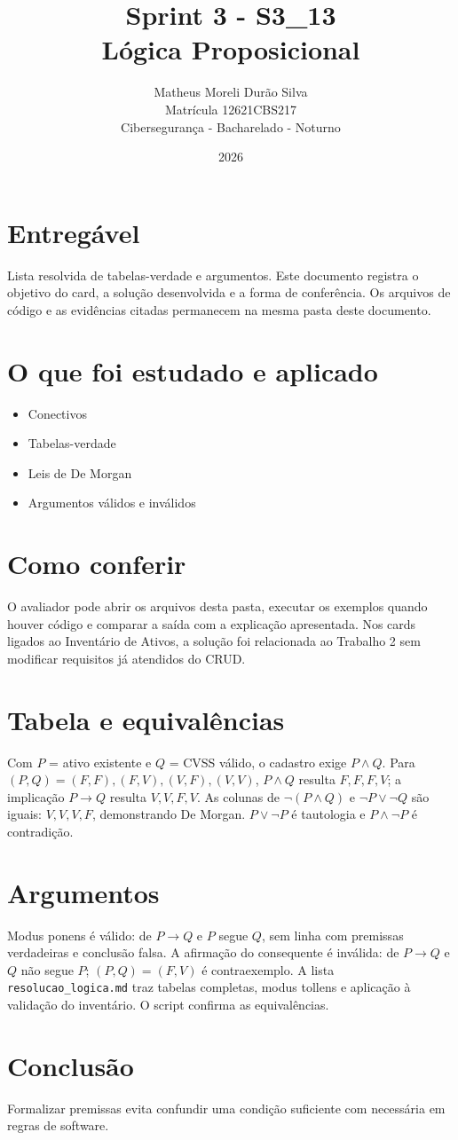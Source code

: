\documentclass[12pt]{article}
\title{Sprint 3 - S3\_13\\Lógica Proposicional}
\author{Matheus Moreli Durão Silva\\Matrícula 12621CBS217\\Cibersegurança - Bacharelado - Noturno}
\date{2026}
\begin{document}
\maketitle

\section*{Entregável}
Lista resolvida de tabelas-verdade e argumentos. Este documento registra o objetivo do card, a solução desenvolvida e a forma de conferência. Os arquivos de código e as evidências citadas permanecem na mesma pasta deste documento.

\section*{O que foi estudado e aplicado}
\begin{itemize}
\item Conectivos
\item Tabelas-verdade
\item Leis de De Morgan
\item Argumentos válidos e inválidos
\end{itemize}

\section*{Como conferir}
O avaliador pode abrir os arquivos desta pasta, executar os exemplos quando houver código e comparar a saída com a explicação apresentada. Nos cards ligados ao Inventário de Ativos, a solução foi relacionada ao Trabalho 2 sem modificar requisitos já atendidos do CRUD.

\section*{Tabela e equivalências}
Com $P$ = ativo existente e $Q$ = CVSS válido, o cadastro exige $P\land Q$. Para $(P,Q)=(F,F),(F,V),(V,F),(V,V)$, $P\land Q$ resulta $F,F,F,V$; a implicação $P\to Q$ resulta $V,V,F,V$. As colunas de $\neg(P\land Q)$ e $\neg P\lor\neg Q$ são iguais: $V,V,V,F$, demonstrando De Morgan. $P\lor\neg P$ é tautologia e $P\land\neg P$ é contradição.
\section*{Argumentos}
Modus ponens é válido: de $P\to Q$ e $P$ segue $Q$, sem linha com premissas verdadeiras e conclusão falsa. A afirmação do consequente é inválida: de $P\to Q$ e $Q$ não segue $P$; $(P,Q)=(F,V)$ é contraexemplo. A lista \texttt{resolucao\_logica.md} traz tabelas completas, modus tollens e aplicação à validação do inventário. O script confirma as equivalências.
\section*{Conclusão}
Formalizar premissas evita confundir uma condição suficiente com necessária em regras de software.
\end{document}
